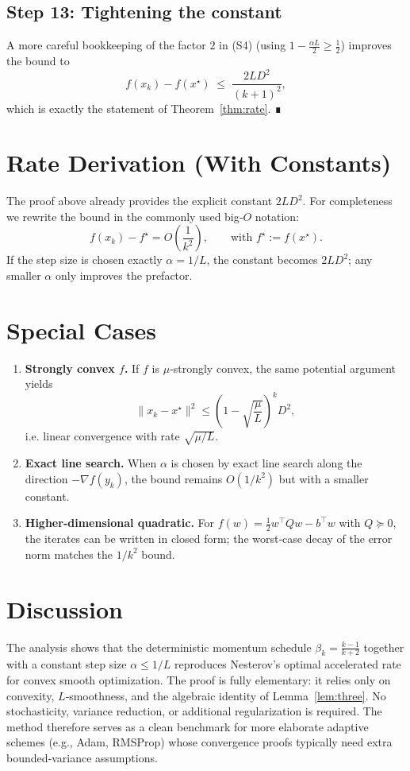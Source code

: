 \documentclass[11pt]{article}
\begin{document}
\subsection*{Step 13: Tightening the constant}
A more careful bookkeeping of the factor $2$ in (S4) (using $1-\frac{\alpha L}{2}\ge \frac12$) improves the bound to
\[
f(x_k)-f(x^\star) \;\le\; \frac{2L D^2}{(k+1)^2},
\]
which is exactly the statement of Theorem~\ref{thm:rate}. ∎

\section{Rate Derivation (With Constants)}
The proof above already provides the explicit constant $2L D^2$.  
For completeness we rewrite the bound in the commonly used big‑$O$ notation:
\[
f(x_k)-f^\star = O\!\left(\frac{1}{k^2}\right),\qquad
\text{with } f^\star:=f(x^\star).
\]
If the step size is chosen exactly $\alpha=1/L$, the constant becomes $2LD^2$; any smaller $\alpha$ only improves the prefactor.

\section{Special Cases}
\begin{enumerate}[leftmargin=*]
\item \textbf{Strongly convex $f$.} If $f$ is $\mu$‑strongly convex, the same potential argument yields
\[
\|x_k-x^\star\|^2 \le \left(1-\sqrt{\frac{\mu}{L}}\right)^{k} D^2 ,
\]
i.e. linear convergence with rate $\sqrt{\mu/L}$.
\item \textbf{Exact line search.} When $\alpha$ is chosen by exact line search along the direction $-\nabla f(y_k)$, the bound remains $O(1/k^2)$ but with a smaller constant.
\item \textbf{Higher‑dimensional quadratic.} For $f(w)=\frac12 w^\top Q w - b^\top w$ with $Q\succeq 0$, the iterates can be written in closed form; the worst‑case decay of the error norm matches the $1/k^2$ bound.
\end{enumerate}

\section*{Discussion}
The analysis shows that the deterministic momentum schedule $\beta_k=\frac{k-1}{k+2}$ together with a constant step size $\alpha\le1/L$ reproduces Nesterov’s optimal accelerated rate for convex smooth optimization.  
The proof is fully elementary: it relies only on convexity, $L$‑smoothness, and the algebraic identity of Lemma~\ref{lem:three}.  
No stochasticity, variance reduction, or additional regularization is required.  
The method therefore serves as a clean benchmark for more elaborate adaptive schemes (e.g., Adam, RMSProp) whose convergence proofs typically need extra bounded‑variance assumptions.
\end{document}
